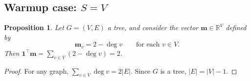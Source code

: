 \documentclass{amsart}
\newtheorem{prop}[thm]{Proposition}
\theoremstyle{definition}
\newcommand{\RR}{\mathbb{R}}
\newcommand{\boldm}{\mathbf{m}}
\newcommand{\tr}{\intercal}
\begin{document}
\subsection{Warmup case: $S = V$}

\begin{prop}
Let $G = (V,E)$ a tree, and consider the vector $\boldm \in \RR^V$
defined by 
\begin{equation}
\boldm_v = 2 - \deg v
\qquad\text{for each }v\in V.
\end{equation}
Then $\mathbf{1}^\tr \boldm = \sum_{v \in V} (2-\deg v) = 2$.
\end{prop}
\begin{proof}
For any graph, $\sum_{v\in V} \deg v = 2 |E|$.
Since $G$ is a tree, $|E| = |V|-1$.
\end{proof}
\end{document}
